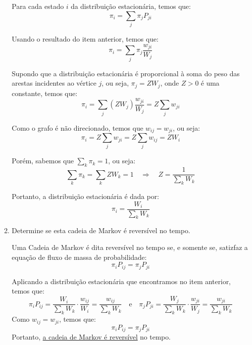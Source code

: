 \begin{enumerate}
\begin{resposta}
        Para cada estado $i$ da distribuição estacionária, temos que:
        $$ \pi_i = \sum_{j} \pi_j P_{ji} $$

        Usando o resultado do item anterior, temos que:
        $$ \pi_i = \sum_{j} \pi_j \frac{w_{ji}}{W_j} $$

        Supondo que a distribuição estacionária é proporcional à soma do peso das arestas incidentes ao vértice $j$, ou seja, $\pi_j = Z W_j$, onde $Z>0$ é uma constante, temos que:
        $$ \pi_i = \sum_{j} (Z W_j) \frac{w_{ji}}{W_j} = Z \sum_{j} w_{ji}$$

        Como o grafo é não direcionado, temos que $w_{ij} = w_{ji}$, ou seja:
        $$ \pi_i = Z \sum_{j} w_{ji} = Z \sum_{j} w_{ij} = Z W_i $$

        Porém, sabemos que $\sum_{k} \pi_k = 1$, ou seja:
        $$ \sum_{k} \pi_k = \sum_{k} Z W_k = 1 \quad \Rightarrow \quad Z = \frac{1}{\sum_{k} W_k}$$
    
        Portanto, a distribuição estacionária é dada por:
        $$ \boxed{\pi_i = \frac{W_i}{\sum_{k} W_k}} $$


    \end{resposta}
    \item Determine se esta cadeia de Markov é reversível no tempo.
    \begin{resposta}
        Uma Cadeia de Markov é dita reversível no tempo se, e somente se, satizfaz a equação de fluxo de massa de probabilidade:
        $$ \pi_i P_{ij} = \pi_j P_{ji} $$

        Aplicando a distribuição estacionária que encontramos no item anterior, temos que:
        $$ \pi_i P_{ij} = \frac{W_i}{\sum_{k} W_k} \cdot \frac{w_{ij}}{W_i} = \frac{w_{ij}}{\sum_{k} W_k}  \quad \text{e} \quad \pi_j P_{ji} = \frac{W_j}{\sum_{k} W_k} \cdot \frac{w_{ji}}{W_j} = \frac{w_{ji}}{\sum_{k} W_k}$$
        Como $w_{ij} = w_{ji}$, temos que:
        $$ \boxed{\pi_i P_{ij} = \pi_j P_{ji}} $$
        Portanto, \underline{a cadeia de Markov é reversível} no tempo.
    \end{resposta}
\end{enumerate}
